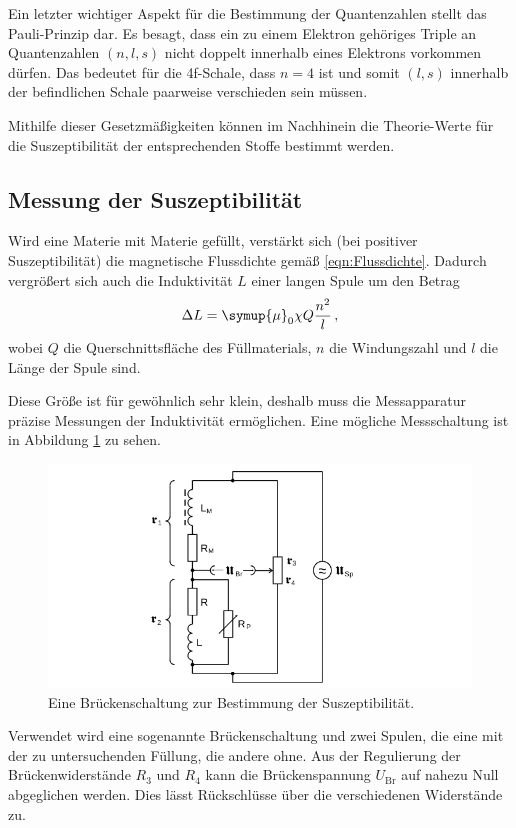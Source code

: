     Ein letzter wichtiger Aspekt für die Bestimmung der Quantenzahlen stellt das Pauli-Prinzip dar. 
    Es besagt, dass ein zu einem Elektron gehöriges Triple an Quantenzahlen $(n,l,s)$ nicht doppelt innerhalb eines Elektrons vorkommen dürfen. 
    Das bedeutet für die 4f-Schale, dass $n=4$ ist und somit $(l,s)$ innerhalb der befindlichen Schale paarweise verschieden sein müssen. 
    
    Mithilfe dieser Gesetzmäßigkeiten können im Nachhinein die Theorie-Werte für die Suszeptibilität der entsprechenden Stoffe bestimmt werden. 

\subsection{Messung der Suszeptibilität}
\label{sub:messmethode}

    Wird eine Materie mit Materie gefüllt, verstärkt sich (bei positiver Suszeptibilität) die magnetische Flussdichte gemäß \eqref{eqn:Flussdichte}. 
    Dadurch vergrößert sich auch die Induktivität $L$ einer langen Spule um den Betrag 
    \begin{equation}
        \Delta L=\symup{\mu}_0 \chi Q \frac{n^2}{l} \,,
    \end{equation}
    wobei $Q$ die Querschnittsfläche des Füllmaterials, $n$ die Windungszahl und $l$ die Länge der Spule  sind. 

    Diese Größe ist für gewöhnlich sehr klein, deshalb muss die Messapparatur präzise Messungen der Induktivität ermöglichen.
    Eine mögliche Messschaltung ist in Abbildung \ref{fig:TolleSchaltung} zu sehen.
    \begin{figure}
        \centering 
        \includegraphics[width=\textwidth]{plots/TolleSchaltung.png}
        \caption{Eine Brückenschaltung zur Bestimmung der Suszeptibilität\cite{Versuchsanleitung}.}
        \label{fig:TolleSchaltung}
    \end{figure}
    Verwendet wird eine sogenannte Brückenschaltung und zwei Spulen, die eine mit der zu untersuchenden Füllung, 
    die andere ohne. 
    Aus der Regulierung der Brückenwiderstände $R_3$ und $R_4$ kann die Brückenspannung $U_\text{Br}$ auf nahezu Null abgeglichen werden. 
    Dies lässt Rückschlüsse über die verschiedenen Widerstände zu. 

